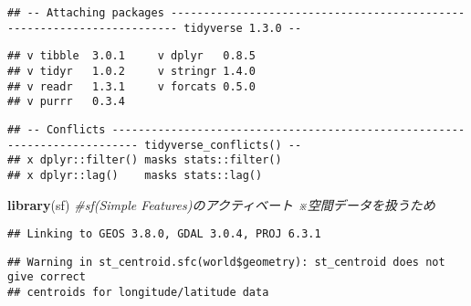 \documentclass[
  xelatex,ja=standard]{bxjsarticle}
\newenvironment{Shaded}{\begin{snugshade}}{\end{snugshade}}
\newcommand{\CommentTok}[1]{\textcolor[rgb]{0.56,0.35,0.01}{\textit{#1}}}
\newcommand{\KeywordTok}[1]{\textcolor[rgb]{0.13,0.29,0.53}{\textbf{#1}}}
\newcommand{\NormalTok}[1]{#1}
\newcommand{\OperatorTok}[1]{\textcolor[rgb]{0.81,0.36,0.00}{\textbf{#1}}}
\newcommand{\StringTok}[1]{\textcolor[rgb]{0.31,0.60,0.02}{#1}}
\begin{document}
\begin{verbatim}
## -- Attaching packages ----------------------------------------------------------------------- tidyverse 1.3.0 --
\end{verbatim}

\begin{verbatim}
## v tibble  3.0.1     v dplyr   0.8.5
## v tidyr   1.0.2     v stringr 1.4.0
## v readr   1.3.1     v forcats 0.5.0
## v purrr   0.3.4
\end{verbatim}

\begin{verbatim}
## -- Conflicts -------------------------------------------------------------------------- tidyverse_conflicts() --
## x dplyr::filter() masks stats::filter()
## x dplyr::lag()    masks stats::lag()
\end{verbatim}

\begin{Shaded}
\begin{Highlighting}[]
\KeywordTok{library}\NormalTok{(sf) }\CommentTok{#sf(Simple Features)のアクティベート ※空間データを扱うため  }
\end{Highlighting}
\end{Shaded}

\begin{verbatim}
## Linking to GEOS 3.8.0, GDAL 3.0.4, PROJ 6.3.1
\end{verbatim}

\begin{Shaded}
\end{Shaded}

\begin{verbatim}
## Warning in st_centroid.sfc(world$geometry): st_centroid does not give correct
## centroids for longitude/latitude data
\end{verbatim}
\end{document}
